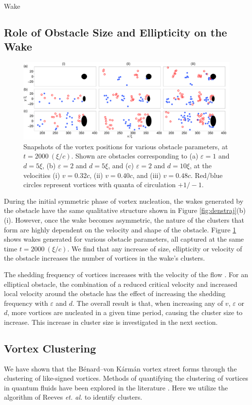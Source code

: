\begin{chapter}{\label{cha:wake}Wake}
\subsection{Role of Obstacle Size and Ellipticity on the Wake}
\label{sec:ellipt}
\begin{figure}
\includegraphics[width=\textwidth]{wake/figure5}
\caption{\label{fig:3x3grid}Snapshots of the vortex positions for various obstacle parameters, at $t=2000~(\xi/c)$. Shown are obstacles corresponding to (a) $\varepsilon=1$ and $d=5\xi$, (b) $\varepsilon=2$ and $d=5\xi$, and (c) $\varepsilon=2$ and $d=10\xi$, at the velocities (i) $v=0.32c$, (ii) $v=0.40c$, and (iii) $v=0.48c$.  Red/blue circles represent vortices with quanta of circulation $+1/-1$.}
\end{figure}
During the initial symmetric phase of vortex nucleation, the wakes generated by the obstacle have the same qualitative structure shown in Figure \ref{fig:denstraj}(b) (i).  However, once the wake becomes asymmetric, the nature of the clusters that form are highly dependent on the velocity and shape of the obstacle. Figure \ref{fig:3x3grid} shows wakes generated for various obstacle parameters, all captured at the same time $t=2000~(\xi/c)$. We find that any increase of size, ellipticity or velocity of the obstacle increases the number of vortices in the wake's clusters.


The shedding frequency of vortices increases with the velocity of the flow \cite{jma99}. For an elliptical obstacle, the combination of a reduced critical velocity and increased local velocity around the obstacle has the effect of increasing the shedding frequency with $\varepsilon$ and $d$. The overall result is that, when increasing any of $v$, $\varepsilon$ or $d$, more vortices are nucleated in a given time period, causing the cluster size to increase. This increase in cluster size is investigated in the next section.

\subsection{Vortex Clustering}
We have shown that the B\'enard--von K\'arm\'an vortex street forms through the clustering of like-signed vortices. Methods of quantifying the clustering of vortices in quantum fluids have been explored in the literature \cite{white12,and13,bagg12}. Here we utilize the algorithm of Reeves \emph{et. al.} \cite{and13} to identify clusters.


\end{chapter}
